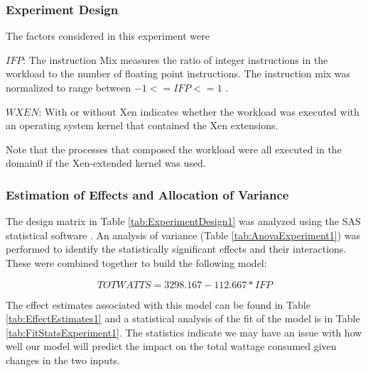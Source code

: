 \documentclass[preprint]{sigplanconf}
\begin{document}
\subsubsection{Experiment Design}

The factors considered in this experiment were 
\begin{list}{}{}
\item $IFP$: The instruction Mix measures the ratio of integer instructions in the
  workload to the number of floating point instructions.  The instruction mix
  was normalized to range between $-1<=IFP<=1$ .
\item $WXEN$: With or without Xen indicates whether the workload was executed
  with an operating system kernel that contained the Xen extensions.
\end{list}
Note that the processes that composed the workload were all executed in the
domain0 if the Xen-extended kernel was used.

\subsubsection{Estimation of Effects and Allocation of Variance}
The design matrix in Table \ref{tab:ExperimentDesign1} was analyzed using the
SAS statistical software \cite{SAS2006}.  An analysis of variance (Table
\ref{tab:AnovaExperiment1}) was performed to identify the statistically
significant effects and their interactions.  These were combined together to
build the following model:

\begin{equation*}
  \label{eq:ModelEquation1}
  TOTWATTS = 3298.167 - 112.667*IFP
\end{equation*}

The effect estimates associated with this model can be found in Table 
\ref{tab:EffectEstimates1} and a statistical analysis of the fit of the model
is in Table \ref{tab:FitStatsExperiment1}.   The statistics indicate we may
have an issue with how well our model will predict the impact on the total
wattage consumed given changes in the two inputs.  
\end{document}
